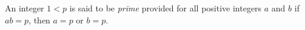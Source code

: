 \guard

\begin{defn}
\label{defn:prime}
  An integer $1<p$ is said to be \emph{prime} provided for all positive integers $a$ and $b$ if $ab=p$, then $a=p$ or $b=p$.
\end{defn}
